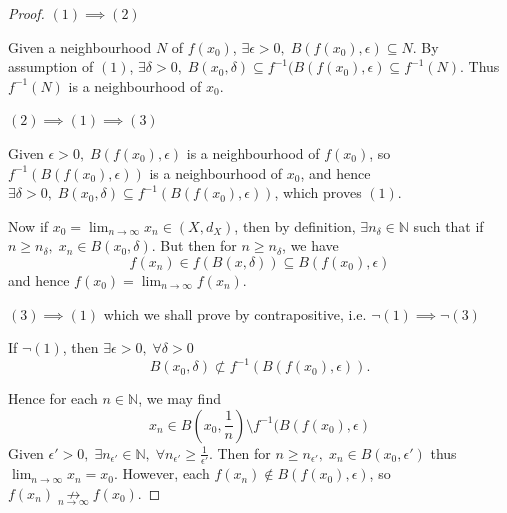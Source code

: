 \documentclass[11pt, oneside]{book}
\theoremstyle{break}
\newtheorem*{proof}{Proof}
\newcommand{\bb}[1]{\mathbb{#1}}			%
\begin{document}
\begin{proof}
	$(1) \implies (2)$

	Given a neighbourhood $N$ of $f(x_0)$, $\exists \epsilon > 0, \; B(f(x_0), \epsilon) \subseteq N$. By assumption of $(1)$, $\exists \delta > 0, \; B(x_0, \delta) \subseteq f^{-1} (B(f(x_0), \epsilon) \subseteq f^{-1}(N)$. Thus $f^{-1}(N)$ is a neighbourhood of $x_0$.

	$(2) \implies (1) \implies (3)$

	Given $\epsilon > 0, \; B(f(x_0), \epsilon)$ is a neighbourhood of $f(x_0)$, so $f^{-1}(B(f(x_0), \epsilon))$ is a neighbourhood of $x_0$, and hence $\exists \delta > 0, \; B(x_0, \delta) \subseteq f^{-1}(B(f(x_0), \epsilon))$, which proves $(1)$.

	Now if $x_0 = \lim_{n \to \infty} x_n \in (X, d_X)$, then by definition, $\exists n_\delta \in \bb{N}$ such that if $n \geq n_\delta, \; x_n \in B(x_0, \delta)$. But then for $n \geq n_\delta$, we have
	\begin{equation*}
		f(x_n) \in f(B(x, \delta)) \subseteq B(f(x_0), \epsilon)
	\end{equation*}
	and hence $f(x_0) = \lim_{n \to \infty} f(x_n)$.

	$(3) \implies (1)$ which we shall prove by contrapositive, i.e. $\neg (1) \implies \neg (3)$

	If $\neg (1)$, then $\exists \epsilon > 0, \; \forall \delta > 0$
	\begin{equation*}
		B(x_0, \delta) \not\subset f^{-1}(B(f(x_0), \epsilon)).
	\end{equation*}

	Hence for each $n \in \bb{N}$, we may find
	\begin{equation*}
	 	x_n \in B(x_0, \frac{1}{n}) \setminus f^{-1}(B(f(x_0), \epsilon)
	\end{equation*}
	Given  $\epsilon' > 0, \; \exists n_{\epsilon'} \in \bb{N}, \; \forall n_{\epsilon'} \geq \frac{1}{\epsilon'}$. Then for $n \geq n_{\epsilon'}, \; x_n \in B(x_0, {\epsilon'})$ thus $\lim_{n \to \infty} x_n = x_0$. However, each $f(x_n) \notin B(f(x_0), \epsilon)$, so $f(x_n) \underset{n \to \infty}{\not\to} f(x_0)$.

\end{proof}
\end{document}
